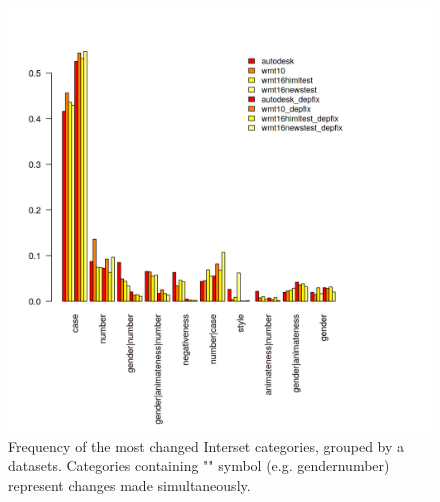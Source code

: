 \begin{figure}
\centering
  \includegraphics[scale=0.7]{iset}
  \caption[Change frequency of Czech morphological categories]{
    Frequency of the most changed Interset categories, grouped by a datasets. Categories containing
    "\textbar" symbol (e.g. gender\textbar{}number) represent changes made simultaneously.
}
  \label{iset-barplot}
\end{figure}

